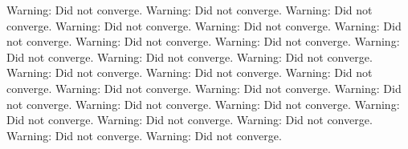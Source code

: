 \documentclass[letterpaper,10pt,english]{jupyterBook}
\begin{document}
\begin{sphinxVerbatim}[commandchars=\\\{\}]
Warning: Did not converge.
Warning: Did not converge.
Warning: Did not converge.
Warning: Did not converge.
Warning: Did not converge.
Warning: Did not converge.
Warning: Did not converge.
Warning: Did not converge.
Warning: Did not converge.
Warning: Did not converge.
Warning: Did not converge.
Warning: Did not converge.
Warning: Did not converge.
Warning: Did not converge.
Warning: Did not converge.
Warning: Did not converge.
Warning: Did not converge.
Warning: Did not converge.
Warning: Did not converge.
Warning: Did not converge.
Warning: Did not converge.
Warning: Did not converge.
Warning: Did not converge.
Warning: Did not converge.
\end{sphinxVerbatim}

\noindent{}
\end{document}
